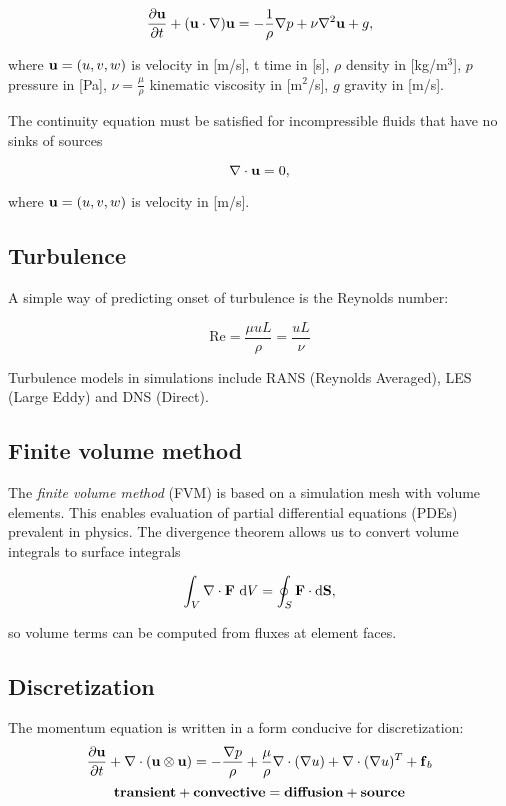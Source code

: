 \documentclass[12pt]{article}
\newcommand{\D}{\text{d}}
\newcommand{\vb}[1]{\text{\textbf{#1}}}
\begin{document}
\begin{equation}
  \frac{\partial \vb u}{\partial t} + (\vb u \cdot \nabla) \vb u = -\frac{1}{\rho} \nabla p + \nu \nabla^2 \vb u + g,
\end{equation}

where $\vb u = (u, v, w)$ is velocity in [m/s], t time in [s], $\rho$ density in [kg/m$^3$], $p$ pressure in [Pa], $\nu=\frac{\mu}{\rho}$ kinematic viscosity in [m$^2$/s], $g$ gravity in [m/s].

The continuity equation must be satisfied for incompressible fluids that have no sinks of sources

\begin{equation}
  \nabla \cdot \vb u = 0,
\end{equation}

where $\vb u = (u, v, w)$ is velocity in [m/s].

\subsection{Turbulence}

\noindent

A simple way of predicting onset of turbulence is the Reynolds number:

$$
\text{Re} = \frac{\mu u L}{\rho} = \frac{u L}{\nu}
$$

Turbulence models in simulations include RANS (Reynolds Averaged), LES (Large Eddy) and DNS (Direct).

\subsection{Finite volume method}

The \textit{finite volume method} (FVM) is based on a simulation mesh with volume elements. This enables evaluation of partial differential equations (PDEs) prevalent in physics. The divergence theorem allows us to convert volume integrals to surface integrals

$$
\int_V \nabla \cdot \vb F \ \D V = \oint_S \vb F \cdot \D \vb S,
$$

\noindent
so volume terms can be computed from fluxes at element faces.

\subsection{Discretization}

\noindent

The momentum equation is written in a form conducive for discretization:
$$
\frac{\partial \vb u}{\partial t} + \nabla \cdot (\vb u \otimes \vb u) = - \frac{\nabla p}{\rho} + \frac{\mu}{\rho} \nabla \cdot (\nabla u) + \nabla \cdot (\nabla u)^T + \vb f_b
$$
$$
\vb{transient} + \vb{convective} =  \vb{diffusion} + \vb{source}
$$
\end{document}
